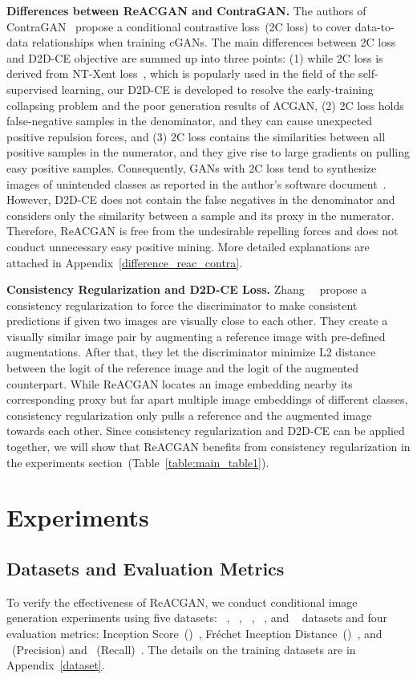 \documentclass{article}
\begin{document}
\textbf{Differences between ReACGAN and ContraGAN.}
The authors of ContraGAN~\cite{kang2020contragan} propose a conditional contrastive loss~(2C loss) to cover data-to-data relationships when training cGANs. The main differences between 2C loss and D2D-CE objective are summed up into three points: (1) while 2C loss is derived from NT-Xent loss~\cite{Chen2020ASF}, which is popularly used in the field of the self-supervised learning, our D2D-CE is developed to resolve the early-training collapsing problem and the poor generation results  of ACGAN, (2) 2C loss holds false-negative samples in the denominator, and they can cause unexpected positive repulsion forces, and (3) 2C loss contains the similarities between all positive samples in the numerator, and they give rise to large gradients on pulling easy positive samples. Consequently, GANs with 2C loss tend to synthesize images of unintended classes as reported in the author's software document~\cite{studiogan}. However, D2D-CE does not contain the false negatives in the denominator and considers only the similarity between a sample and its proxy in the numerator. Therefore, ReACGAN is free from the undesirable repelling forces and does not conduct unnecessary easy positive mining. More detailed explanations are attached in Appendix~\ref{difference_reac_contra}.

\textbf{Consistency Regularization and D2D-CE Loss.} Zhang~\etal~\cite{Zhang2019ConsistencyRF} propose a consistency regularization to force the discriminator to make consistent predictions if given two images are visually close to each other. They create a visually similar image pair by augmenting a reference image with pre-defined augmentations. After that, they let the discriminator minimize L2 distance between the logit of the reference image and the logit of the augmented counterpart. While ReACGAN locates an image embedding nearby its corresponding proxy but far apart multiple image embeddings of different classes, consistency regularization only pulls a reference and the augmented image towards each other. Since consistency regularization and D2D-CE can be applied together, we will show that ReACGAN benefits from consistency regularization in the experiments section~(Table~\ref{table:main_table1}). \section{Experiments}
\subsection{Datasets and Evaluation Metrics}
\label{sec:experiment_datasets}
To verify the effectiveness of ReACGAN, we conduct conditional image generation experiments using five datasets: ~\cite{Krizhevsky2009LearningML}, ~\cite{Tiny}, ~\cite{WelinderEtal2010}, ~\cite{Deng2009ImageNetAL}, and ~\cite{choi2020starganv2} datasets and four evaluation metrics: Inception Score~()~\cite{Salimans2016ImprovedTF}, Fr\'echet Inception Distance~()~\cite{Heusel2017GANsTB}, and ~(Precision) and ~(Recall)~\cite{sajjadi2018assessing}. The details on the training datasets are in Appendix~\ref{dataset}.
\end{document}
